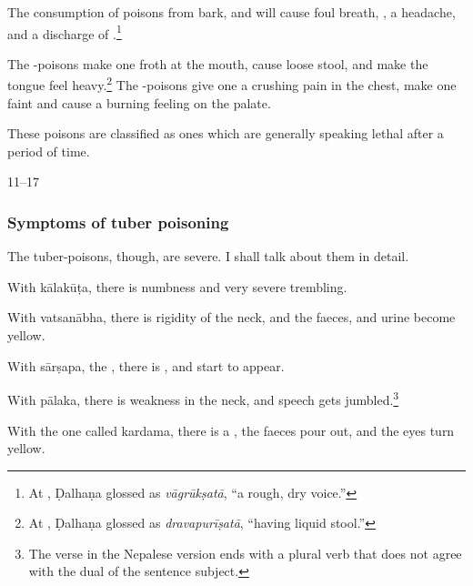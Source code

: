 \begin{translation}
The consumption of poisons from bark,  and
 will cause foul breath, ,
a headache, and a discharge of .\footnote{At
    , Ḍalhaṇa glossed  as
    \emph{vāgrūkṣatā}, “a rough, dry voice.”}
    
    
The -poisons make one froth at the mouth,  cause
loose stool, and make the tongue feel heavy.\footnote{At
    , Ḍalhaṇa glossed  as
    \emph{dravapurīṣatā}, “having liquid stool.” }  The
    -poisons give one a crushing pain in the chest,
    make one faint and cause a burning feeling on the palate.
    
    These poisons
    are classified as ones which are generally speaking lethal after a period of time.
    
    \item[11--17]
    
    \subsubsection{Symptoms of tuber poisoning}
    The tuber-poisons, though, are severe.  I shall talk about them in detail.
    
    
    With
    \gls{kālakūṭa},
 there is numbness and very severe trembling.

%
    With
    \gls{vatsanābha},
there is rigidity of the neck, and the faeces,
    and urine become yellow.
    
With \gls{sārṣapa}, 
the , there is
, and  start to appear.

With \gls{pālaka},
there is weakness
in the neck, and speech gets jumbled.\footnote{The verse in the Nepalese 
version 
ends with a plural verb that does not agree with the dual of the sentence subject.}
    
With the one called \gls{kardama}, there is a
, the faeces pour out, and  the eyes turn
yellow. 


\end{translation}
